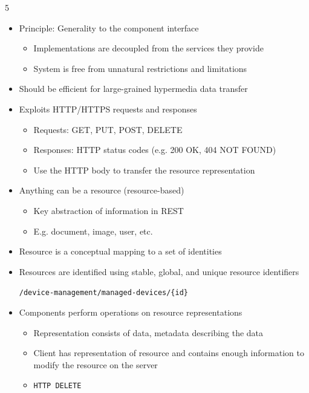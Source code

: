 \documentclass[landscape,a4paper]{extarticle}
\begin{document}
\begin{multicols*}{5}
    \begin{itemize}
        \item Principle: Generality to the component interface
        \begin{itemize}
            \item Implementations are decoupled from the services they provide
            \item System is free from unnatural restrictions and limitations
        \end{itemize}
        \item Should be efficient for large-grained hypermedia data transfer
        \item Exploits HTTP/HTTPS requests and responses
        \begin{itemize}
            \item Requests: GET, PUT, POST, DELETE
            \item Responses: HTTP status codes (e.g. 200 OK, 404 NOT FOUND)
            \item Use the HTTP body to transfer the resource representation
        \end{itemize}
        \item Anything can be a resource (resource-based)
        \begin{itemize}
            \item Key abstraction of information in REST
            \item E.g. document, image, user, etc.
        \end{itemize}
        \item Resource is a conceptual mapping to a set of identities
        \item Resources are identified using stable, global, and unique resource identifiers
        
        \verb|/device-management/managed-devices/{id}|
        \item Components perform operations on resource representations
        \begin{itemize}
            \item Representation consists of data, metadata describing the data
            \item Client has representation of resource and contains enough information
            to modify the resource on the server
            \item \verb|HTTP DELETE|


\end{itemize}
\end{itemize}
\end{multicols*}
\end{document}
